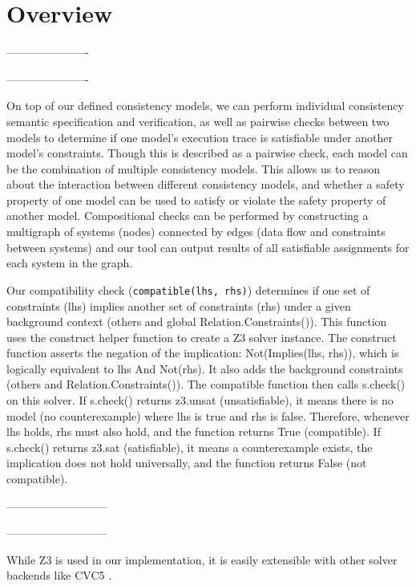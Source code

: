 \section*{Overview}

----------------------

----------------------

On top of our defined consistency models, we can perform
individual consistency semantic specification and verification, as
well as pairwise checks between two models to determine if one
model's execution trace is satisfiable under another model's
constraints. Though this is described as a pairwise check, each model
can be the combination of multiple consistency models. This allows us
to reason about the interaction between different consistency models,
and whether a safety property of one model can be used to satisfy or
violate the safety property of another model. Compositional checks
can be performed by constructing a multigraph of systems (nodes)
connected by edges (data flow and constraints between systems) and
our tool can output results of all satisfiable assignments for each
system in the graph.

Our compatibility check (\texttt{compatible(lhs, rhs)}) determines if
one set of constraints (lhs) implies another set of constraints (rhs)
under a given background context (others and global
Relation.Constraints()). This function uses the construct helper
function to create a Z3 solver instance. The construct function
asserts the negation of the implication: Not(Implies(lhs, rhs)),
which is logically equivalent to lhs And Not(rhs). It also adds the
background constraints (others and Relation.Constraints()). The
compatible function then calls s.check() on this solver. If s.check()
returns z3.unsat (unsatisfiable), it means there is no model (no
counterexample) where lhs is true and rhs is false. Therefore,
whenever lhs holds, rhs must also hold, and the function returns True
(compatible). If s.check() returns z3.sat (satisfiable), it means a
counterexample exists, the implication does not hold universally, and
the function returns False (not compatible).

---------------------------

---------------------------

While Z3 \cite{demoura2008z3} is used in our implementation, it is easily
extensible with other solver backends like CVC5 \cite{barbosa2022cvc5}.

